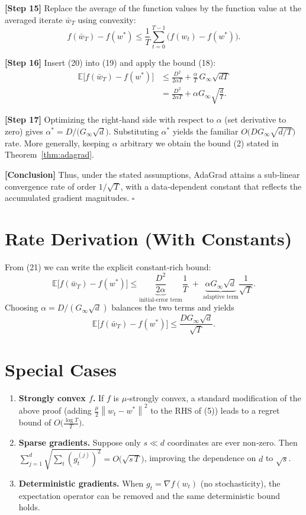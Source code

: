 \documentclass[11pt]{article}
\newcommand{\E}{\mathbb{E}}
\newcommand{\norm}[1]{\left\| #1 \right\|}
\begin{document}
\noindent\textbf{[Step 15]}  
Replace the average of the function values by the function value at the averaged iterate $\bar w_{T}$ using convexity:
\[
f(\bar w_{T})-f(w^{*})\le\frac{1}{T}\sum_{t=0}^{T-1}\bigl(f(w_{t})-f(w^{*})\bigr).
\tag{20}
\]

\noindent\textbf{[Step 16]}  
Insert (20) into (19) and apply the bound (18):
\[
\begin{aligned}
\E\!\bigl[f(\bar w_{T})-f(w^{*})\bigr]
&\le
\frac{D^{2}}{2\alpha T}
+\frac{\alpha}{T}\,G_{\infty}\sqrt{dT}\\[1ex]
&=
\frac{D^{2}}{2\alpha T}
+\alpha G_{\infty}\sqrt{\frac{d}{T}} .
\end{aligned}
\tag{21}
\]

\noindent\textbf{[Step 17]}  
Optimizing the right‑hand side with respect to $\alpha$ (set derivative to zero) gives $\alpha^{*}=D/\bigl(G_{\infty}\sqrt{d}\bigr)$. Substituting $\alpha^{*}$ yields the familiar $O\!\bigl(DG_{\infty}\sqrt{d/T}\bigr)$ rate. More generally, keeping $\alpha$ arbitrary we obtain the bound (2) stated in Theorem~\ref{thm:adagrad}.

\noindent\textbf{[Conclusion]}  
Thus, under the stated assumptions, AdaGrad attains a sub‑linear convergence rate of order $1/\sqrt{T}$, with a data‑dependent constant that reflects the accumulated gradient magnitudes. $\square$

\section*{Rate Derivation (With Constants)}
From (21) we can write the explicit constant‑rich bound:
\[
\E\!\bigl[f(\bar w_{T})-f(w^{*})\bigr]
\le
\underbrace{\frac{D^{2}}{2\alpha}}_{\text{initial‑error term}}\frac{1}{T}
\;+\;
\underbrace{\alpha G_{\infty}\sqrt{d}}_{\text{adaptive term}}\frac{1}{\sqrt{T}} .
\]
Choosing $\alpha = D/(G_{\infty}\sqrt{d})$ balances the two terms and yields
\[
\E\!\bigl[f(\bar w_{T})-f(w^{*})\bigr]\le
\frac{DG_{\infty}\sqrt{d}}{\sqrt{T}} .
\]

\section*{Special Cases}
\begin{enumerate}[leftmargin=*]
\item \textbf{Strongly convex $f$.} If $f$ is $\mu$‑strongly convex, a standard modification of the above proof (adding $\frac{\mu}{2}\norm{w_{t}-w^{*}}^{2}$ to the RHS of (5)) leads to a regret bound of $O\!\bigl(\frac{\log T}{T}\bigr)$.
\item \textbf{Sparse gradients.} Suppose only $s\ll d$ coordinates are ever non‑zero. Then $\sum_{j=1}^{d}\sqrt{\sum_{t}(g_{t}^{(j)})^{2}} = O\!\bigl(\sqrt{s\,T}\bigr)$, improving the dependence on $d$ to $\sqrt{s}$.
\item \textbf{Deterministic gradients.} When $g_{t}=\nabla f(w_{t})$ (no stochasticity), the expectation operator can be removed and the same deterministic bound holds.
\end{enumerate}
\end{document}
